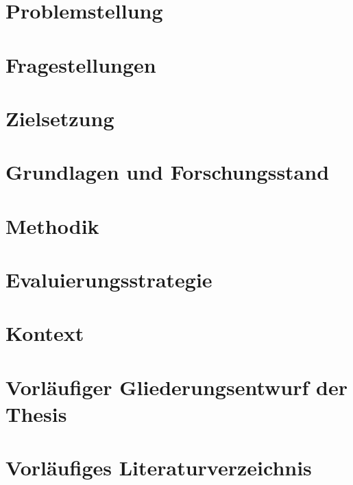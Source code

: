 \documentclass[
  11pt,
  a4paper,
  oneside,
  titlepage,
  numbers=noenddot
]{scrartcl}
\begin{document}
\setcounter{page}{1}   %

\section{Problemstellung}


\section{Fragestellungen}


\section{Zielsetzung}


\section{Grundlagen und Forschungsstand}


\section{Methodik}


\section{Evaluierungsstrategie}


\section{Kontext}


\clearpage
\appendix
\section{Vorläufiger Gliederungsentwurf der Thesis}


\section{Vorläufiges Literaturverzeichnis}
\printbibliography
\end{document}
